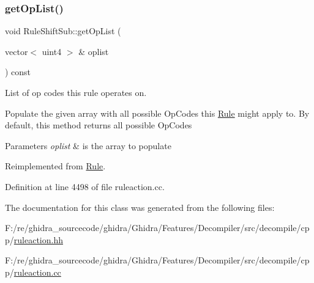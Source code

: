 \subsubsection{\texorpdfstring{getOpList()}{getOpList()}}
{\footnotesize\ttfamily void Rule\+Shift\+Sub\+::get\+Op\+List (\begin{DoxyParamCaption}\item[{vector$<$ uint4 $>$ \&}]{oplist }\end{DoxyParamCaption}) const\hspace{0.3cm}{\ttfamily [virtual]}}



List of op codes this rule operates on. 

Populate the given array with all possible Op\+Codes this \mbox{\hyperlink{class_rule}{Rule}} might apply to. By default, this method returns all possible Op\+Codes 
\begin{DoxyParams}{Parameters}
{\em oplist} & is the array to populate \\
\hline
\end{DoxyParams}


Reimplemented from \mbox{\hyperlink{class_rule_a4023bfc7825de0ab866790551856d10e}{Rule}}.



Definition at line 4498 of file ruleaction.\+cc.



The documentation for this class was generated from the following files\+:\begin{DoxyCompactItemize}
\item 
F\+:/re/ghidra\+\_\+sourcecode/ghidra/\+Ghidra/\+Features/\+Decompiler/src/decompile/cpp/\mbox{\hyperlink{ruleaction_8hh}{ruleaction.\+hh}}\item 
F\+:/re/ghidra\+\_\+sourcecode/ghidra/\+Ghidra/\+Features/\+Decompiler/src/decompile/cpp/\mbox{\hyperlink{ruleaction_8cc}{ruleaction.\+cc}}\end{DoxyCompactItemize}

